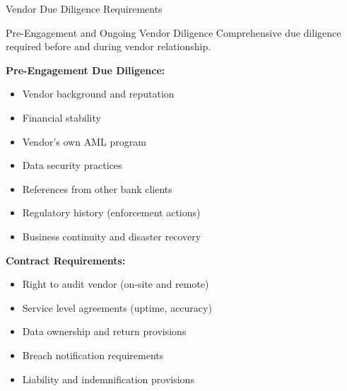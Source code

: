 \documentclass[11pt,a4paper]{beamer}
\begin{document}
	\begin{frame}{Vendor Due Diligence Requirements}
		\begin{block}{Pre-Engagement and Ongoing Vendor Diligence}
			Comprehensive due diligence required before and during vendor relationship.
		\end{block}
		\textbf{Pre-Engagement Due Diligence:}
		\begin{itemize}
			\item Vendor background and reputation
			\item Financial stability
			\item Vendor's own AML program
			\item Data security practices
			\item References from other bank clients
			\item Regulatory history (enforcement actions)
			\item Business continuity and disaster recovery
		\end{itemize}
		\textbf{Contract Requirements:}
		\begin{itemize}
			\item Right to audit vendor (on-site and remote)
			\item Service level agreements (uptime, accuracy)
			\item Data ownership and return provisions
			\item Breach notification requirements
			\item Liability and indemnification provisions
		\end{itemize}
	\end{frame}
	
	
\end{document}
